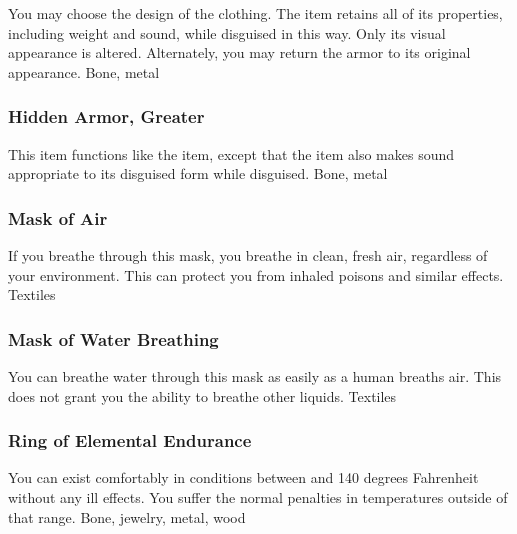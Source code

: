 You may choose the design of the clothing.
The item retains all of its properties, including weight and sound, while disguised in this way.
Only its visual appearance is altered.
Alternately, you may return the armor to its original appearance.
 
 Bone, metal
\lowercase{\hypertarget{item:Hidden Armor, Greater}{}}\label{item:Hidden Armor, Greater}
\hypertarget{item:Hidden Armor, Greater}{\subsubsection{Hidden Armor, Greater\hfill{}}}
This item functions like the  item, except that the item also makes sound appropriate to its disguised form while disguised.
 
 Bone, metal
\lowercase{\hypertarget{item:Mask of Air}{}}\label{item:Mask of Air}
\hypertarget{item:Mask of Air}{\subsubsection{Mask of Air\hfill{}}}
If you breathe through this mask, you breathe in clean, fresh air, regardless of your environment.
This can protect you from inhaled poisons and similar effects.
 
 Textiles
\lowercase{\hypertarget{item:Mask of Water Breathing}{}}\label{item:Mask of Water Breathing}
\hypertarget{item:Mask of Water Breathing}{\subsubsection{Mask of Water Breathing\hfill{}}}
You can breathe water through this mask as easily as a human breaths air.
This does not grant you the ability to breathe other liquids.
 
 Textiles
\lowercase{\hypertarget{item:Ring of Elemental Endurance}{}}\label{item:Ring of Elemental Endurance}
\hypertarget{item:Ring of Elemental Endurance}{\subsubsection{Ring of Elemental Endurance\hfill{}}}
You can exist comfortably in conditions between  and 140 degrees Fahrenheit without any ill effects.
You suffer the normal penalties in temperatures outside of that range.
 
 Bone, jewelry, metal, wood
\lowercase{\hypertarget{item:Ring of Energy Resistance}{}}\label{item:Ring of Energy Resistance}
